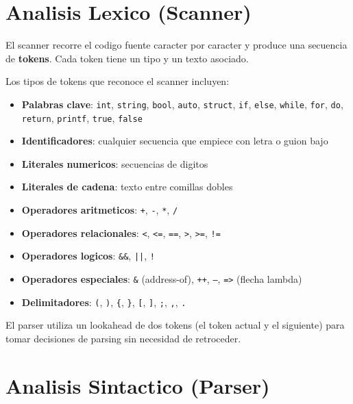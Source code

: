 \documentclass[12pt, a4paper]{article}
\begin{document}
\newpage

\section{Analisis Lexico (Scanner)}

El scanner recorre el codigo fuente caracter por caracter y produce una secuencia de \textbf{tokens}. Cada token tiene un tipo y un texto asociado.

Los tipos de tokens que reconoce el scanner incluyen:

\begin{itemize}
    \item \textbf{Palabras clave}: \texttt{int}, \texttt{string}, \texttt{bool}, \texttt{auto}, \texttt{struct}, \texttt{if}, \texttt{else}, \texttt{while}, \texttt{for}, \texttt{do}, \texttt{return}, \texttt{printf}, \texttt{true}, \texttt{false}
    \item \textbf{Identificadores}: cualquier secuencia que empiece con letra o guion bajo
    \item \textbf{Literales numericos}: secuencias de digitos
    \item \textbf{Literales de cadena}: texto entre comillas dobles
    \item \textbf{Operadores aritmeticos}: \texttt{+}, \texttt{-}, \texttt{*}, \texttt{/}
    \item \textbf{Operadores relacionales}: \texttt{<}, \texttt{<=}, \texttt{==}, \texttt{>}, \texttt{>=}, \texttt{!=}
    \item \textbf{Operadores logicos}: \texttt{\&\&}, \texttt{||}, \texttt{!}
    \item \textbf{Operadores especiales}: \texttt{\&} (address-of), \texttt{++}, \texttt{--}, \texttt{=>} (flecha lambda)
    \item \textbf{Delimitadores}: \texttt{(}, \texttt{)}, \texttt{\{}, \texttt{\}}, \texttt{[}, \texttt{]}, \texttt{;}, \texttt{,}, \texttt{.}
\end{itemize}

El parser utiliza un lookahead de dos tokens (el token actual y el siguiente) para tomar decisiones de parsing sin necesidad de retroceder.

\newpage

\section{Analisis Sintactico (Parser)}
\end{document}
